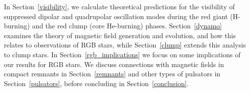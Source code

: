 In Section~\ref{visibility}, we calculate theoretical predictions for the visibility of suppressed dipolar and quadrupolar oscillation modes during the red giant (H-burning) and the red clump (core He-burning) phases. Section~\ref{dynamo} examines the theory of magnetic field generation and evolution, and how this relates to observations of RGB stars, while Section~\ref{clump} extends this analysis to clump stars. In Section~\ref{rgb_implications} we focus on some implications of our results for RGB stars. We discuss connections with magnetic fields in compact remnants in Section~\ref{remnants} and other types of pulsators in Section~\ref{pulsators}, before concluding in Section~\ref{conclusion}. 




  